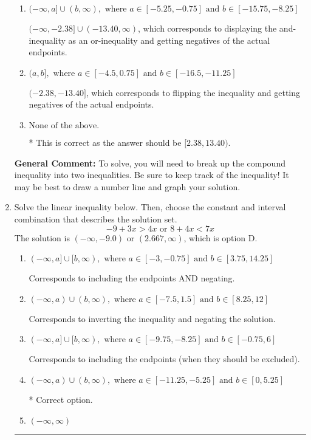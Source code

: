 \documentclass{extbook}[14pt]
\newcommand{\litem}[1]{\item #1

\rule{\textwidth}{0.4pt}}
\begin{document}
\begin{enumerate}
{\begin{enumerate}[label=\Alph*.]
$(-\infty, -2.38) \cup [-13.40, \infty)$, which corresponds to displaying the and-inequality as an or-inequality AND flipping the inequality AND getting negatives of the actual endpoints.
\item \( (-\infty, a] \cup (b, \infty), \text{ where } a \in [-5.25, -0.75] \text{ and } b \in [-15.75, -8.25] \)

$(-\infty, -2.38] \cup (-13.40, \infty)$, which corresponds to displaying the and-inequality as an or-inequality and getting negatives of the actual endpoints.
\item \( (a, b], \text{ where } a \in [-4.5, 0.75] \text{ and } b \in [-16.5, -11.25] \)

$(-2.38, -13.40]$, which corresponds to flipping the inequality and getting negatives of the actual endpoints.
\item \( \text{None of the above.} \)

* This is correct as the answer should be $[2.38, 13.40)$.
\end{enumerate}

\textbf{General Comment:} To solve, you will need to break up the compound inequality into two inequalities. Be sure to keep track of the inequality! It may be best to draw a number line and graph your solution.
}
\litem{
Solve the linear inequality below. Then, choose the constant and interval combination that describes the solution set.
\[ -9 + 3 x > 4 x \text{ or } 8 + 4 x < 7 x \]The solution is \( (-\infty, -9.0) \text{ or } (2.667, \infty) \), which is option D.\begin{enumerate}[label=\Alph*.]
\item \( (-\infty, a] \cup [b, \infty), \text{ where } a \in [-3, -0.75] \text{ and } b \in [3.75, 14.25] \)

Corresponds to including the endpoints AND negating.
\item \( (-\infty, a) \cup (b, \infty), \text{ where } a \in [-7.5, 1.5] \text{ and } b \in [8.25, 12] \)

Corresponds to inverting the inequality and negating the solution.
\item \( (-\infty, a] \cup [b, \infty), \text{ where } a \in [-9.75, -8.25] \text{ and } b \in [-0.75, 6] \)

Corresponds to including the endpoints (when they should be excluded).
\item \( (-\infty, a) \cup (b, \infty), \text{ where } a \in [-11.25, -5.25] \text{ and } b \in [0, 5.25] \)

 * Correct option.
\item \( (-\infty, \infty) \)


\end{enumerate}}
\end{enumerate}
\end{document}
